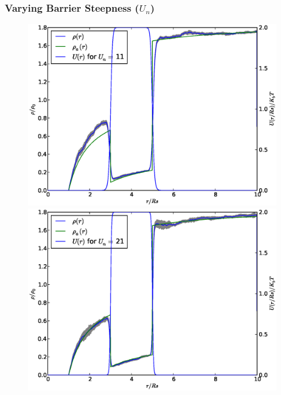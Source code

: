 \subsubsection{Varying Barrier Steepness ($U_n$)}
\begin{figure}[H]
\centering
\begin{minipage}{.5 \textwidth}
    \centering
    \includegraphics[width=.95 \textwidth, keepaspectratio]{plots/cp/un/Un11.eps}
\end{minipage}\begin{minipage}{.5 \textwidth}
    \includegraphics[width=.95 \textwidth, keepaspectratio]{plots/cp/un/Un21.eps}
\end{minipage}
\begin{minipage}{.5 \textwidth}

\end{minipage}
\end{figure}

